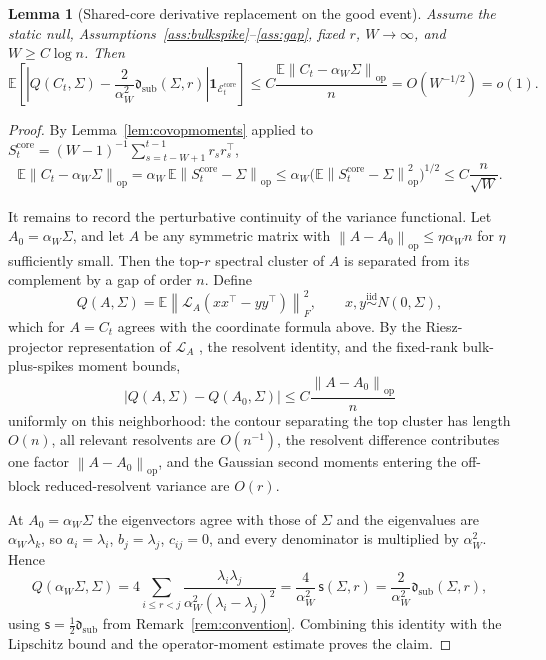 \documentclass[11pt]{article}
\theoremstyle{tightplain}
\newtheorem{lemma}[theorem]{Lemma}
\theoremstyle{tightdef}
\DeclareMathOperator{\op}{op}
\newcommand{\E}{\mathbb E}
\newcommand{\norm}[1]{\left\lVert #1 \right\rVert}
\newcommand{\abs}[1]{\left\lvert #1 \right\rvert}
\newcommand{\one}{\mathbf 1}
\newcommand{\ssum}{\mathsf s}
\begin{document}
\begin{lemma}[Shared-core derivative replacement on the good event]
\label{lem:corederivativeproved}
Assume the static null, Assumptions~\ref{ass:bulkspike}--\ref{ass:gap}, fixed
$r$, $W\to\infty$, and $W\ge C\log n$. Then
\[
\E\left[
\left|
Q(C_t,\Sigma)
-
\frac{2}{\alpha_W^2}\mathfrak d_{\mathrm{sub}}(\Sigma,r)
\right|
\one_{\mathcal E_t^{\mathrm{core}}}
\right]
\le
C\frac{\E\norm{C_t-\alpha_W\Sigma}_{\op}}{n}
=
O(W^{-1/2})
=o(1).
\]
\end{lemma}

\begin{proof}
By Lemma~\ref{lem:covopmoments} applied to
$S_t^{\mathrm{core}}=(W-1)^{-1}\sum_{s=t-W+1}^{t-1}r_s r_s^\top$,
\[
\E\norm{C_t-\alpha_W\Sigma}_{\op}
=\alpha_W\,\E\norm{S_t^{\mathrm{core}}-\Sigma}_{\op}
\le \alpha_W\bigl(\E\norm{S_t^{\mathrm{core}}-\Sigma}_{\op}^2\bigr)^{1/2}
\le
C\frac{n}{\sqrt W}.
\]

It remains to record the perturbative continuity of the variance functional.
Let $A_0=\alpha_W\Sigma$, and let $A$ be any symmetric matrix with
$\norm{A-A_0}_{\op}\le \eta\alpha_W n$ for $\eta$ sufficiently small. Then the
top-$r$ spectral cluster of $A$ is separated from its complement by a gap of
order $n$. Define
\[
Q(A,\Sigma)
=
\E\norm{\mathcal L_A(xx^\top-yy^\top)}_F^2,
\qquad
x,y\stackrel{\mathrm{iid}}{\sim}N(0,\Sigma),
\]
which for $A=C_t$ agrees with the coordinate formula above. By the
Riesz-projector representation of $\mathcal L_A$ \cite[Ch.~II]{Kato1995}, the
resolvent identity, and the fixed-rank bulk-plus-spikes moment bounds,
\[
\abs{Q(A,\Sigma)-Q(A_0,\Sigma)}
\le
C\frac{\norm{A-A_0}_{\op}}{n}
\]
uniformly on this neighborhood: the contour separating the top cluster has
length $O(n)$, all relevant resolvents are $O(n^{-1})$, the resolvent
difference contributes one factor $\norm{A-A_0}_{\op}$, and the Gaussian second
moments entering the off-block reduced-resolvent variance are $O(r)$.

At $A_0=\alpha_W\Sigma$ the eigenvectors agree with those of $\Sigma$ and the
eigenvalues are $\alpha_W\lambda_k$, so $a_i=\lambda_i$, $b_j=\lambda_j$,
$c_{ij}=0$, and every denominator is multiplied by $\alpha_W^2$. Hence
\[
Q(\alpha_W\Sigma,\Sigma)
=4\sum_{i\le r<j}\frac{\lambda_i\lambda_j}{\alpha_W^2(\lambda_i-\lambda_j)^2}
=\frac{4}{\alpha_W^2}\,\ssum(\Sigma,r)
=
\frac{2}{\alpha_W^2}\mathfrak d_{\mathrm{sub}}(\Sigma,r),
\]
using $\ssum=\tfrac12\mathfrak d_{\mathrm{sub}}$ from
Remark~\ref{rem:convention}. Combining this identity with the Lipschitz bound
and the operator-moment estimate proves the claim.
\end{proof}
\end{document}
